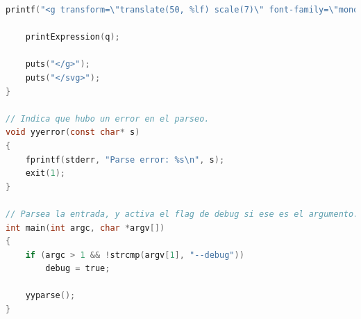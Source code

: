 \documentclass[a4paper, 10pt, twoside]{article}
\begin{document}
\begin{lstlisting}[language=C]
	printf("<g transform=\"translate(50, %lf) scale(7)\" font-family=\"monospace\">\n", 300 - q->d.ny);

	printExpression(q);

	puts("</g>");
	puts("</svg>");
}

// Indica que hubo un error en el parseo.
void yyerror(const char* s)
{
	fprintf(stderr, "Parse error: %s\n", s);
	exit(1);
}

// Parsea la entrada, y activa el flag de debug si ese es el argumento.
int main(int argc, char *argv[])
{
	if (argc > 1 && !strcmp(argv[1], "--debug"))
		debug = true;

	yyparse();
}
\end{lstlisting}
\end{document}
